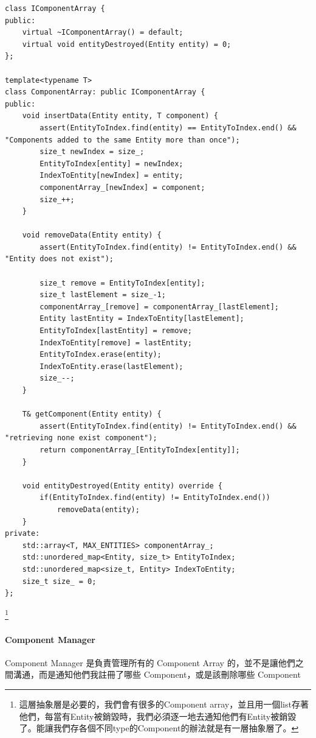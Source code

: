 \begin{lstlisting}
class IComponentArray {
public:
    virtual ~IComponentArray() = default;
    virtual void entityDestroyed(Entity entity) = 0;
};

template<typename T>
class ComponentArray: public IComponentArray {
public:
    void insertData(Entity entity, T component) {
        assert(EntityToIndex.find(entity) == EntityToIndex.end() && "Components added to the same Entity more than once");
        size_t newIndex = size_;
        EntityToIndex[entity] = newIndex;
        IndexToEntity[newIndex] = entity;
        componentArray_[newIndex] = component;
        size_++;
    }

    void removeData(Entity entity) {
        assert(EntityToIndex.find(entity) != EntityToIndex.end() && "Entity does not exist");

        size_t remove = EntityToIndex[entity];
        size_t lastElement = size_-1;
        componentArray_[remove] = componentArray_[lastElement];
        Entity lastEntity = IndexToEntity[lastElement];
        EntityToIndex[lastEntity] = remove;
        IndexToEntity[remove] = lastEntity;
        EntityToIndex.erase(entity);
        IndexToEntity.erase(lastElement);
        size_--;
    }

    T& getComponent(Entity entity) {
        assert(EntityToIndex.find(entity) != EntityToIndex.end() && "retrieving none exist component");
        return componentArray_[EntityToIndex[entity]];
    }

    void entityDestroyed(Entity entity) override {
        if(EntityToIndex.find(entity) != EntityToIndex.end())
            removeData(entity);
    }
private:
    std::array<T, MAX_ENTITIES> componentArray_;
    std::unordered_map<Entity, size_t> EntityToIndex;
    std::unordered_map<size_t, Entity> IndexToEntity;
    size_t size_ = 0;
};
\end{lstlisting}\footnote{這層抽象層是必要的，我們會有很多的Component array，並且用一個list存著他們，每當有Entity被銷毀時，我們必須逐一地去通知他們有Entity被銷毀了。能讓我們存各個不同type的Component的辦法就是有一層抽象層了。}

\paragraph{Component Manager}

Component Manager 是負責管理所有的 Component Array 的，並不是讓他們之間溝通，而是通知他們我註冊了哪些 Component，或是該刪除哪些 Component

